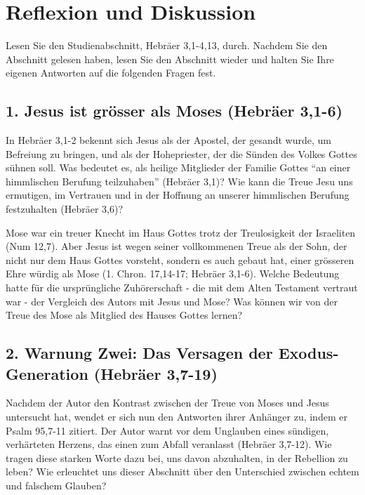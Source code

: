 \documentclass[]{krantz}
\begin{document}
\section{Reflexion und Diskussion}\label{reflexion-und-diskussion-2}

Lesen Sie den Studienabschnitt, Hebräer 3,1-4,13, durch. Nachdem Sie den
Abschnitt gelesen haben, lesen Sie den Abschnitt wieder und halten Sie
Ihre eigenen Antworten auf die folgenden Fragen fest.

\subsection{1. Jesus ist grösser als Moses (Hebräer
3,1-6)}\label{jesus-ist-gruxf6sser-als-moses-hebruxe4er-31-6}

In Hebräer 3,1-2 bekennt sich Jesus als der Apostel, der gesandt wurde,
um Befreiung zu bringen, und als der Hohepriester, der die Sünden des
Volkes Gottes sühnen soll. Was bedeutet es, als heilige Mitglieder der
Familie Gottes ``an einer himmlischen Berufung teilzuhaben'' (Hebräer
3,1)? Wie kann die Treue Jesu uns ermutigen, im Vertrauen und in der
Hoffnung an unserer himmlischen Berufung festzuhalten (Hebräer 3,6)?

Mose war ein treuer Knecht im Haus Gottes trotz der Treulosigkeit der
Israeliten (Num 12,7). Aber Jesus ist wegen seiner vollkommenen Treue
als der Sohn, der nicht nur dem Haus Gottes vorsteht, sondern es auch
gebaut hat, einer grösseren Ehre würdig als Mose (1. Chron. 17,14-17;
Hebräer 3,1-6). Welche Bedeutung hatte für die ursprüngliche
Zuhörerschaft - die mit dem Alten Testament vertraut war - der Vergleich
des Autors mit Jesus und Mose? Was können wir von der Treue des Mose als
Mitglied des Hauses Gottes lernen?

\subsection{2. Warnung Zwei: Das Versagen der Exodus-Generation (Hebräer
3,7-19)}\label{warnung-zwei-das-versagen-der-exodus-generation-hebruxe4er-37-19}

Nachdem der Autor den Kontrast zwischen der Treue von Moses und Jesus
untersucht hat, wendet er sich nun den Antworten ihrer Anhänger zu,
indem er Psalm 95,7-11 zitiert. Der Autor warnt vor dem Unglauben eines
sündigen, verhärteten Herzens, das einen zum Abfall veranlasst (Hebräer
3,7-12). Wie tragen diese starken Worte dazu bei, uns davon abzuhalten,
in der Rebellion zu leben? Wie erleuchtet uns dieser Abschnitt über den
Unterschied zwischen echtem und falschem Glauben?
\end{document}
